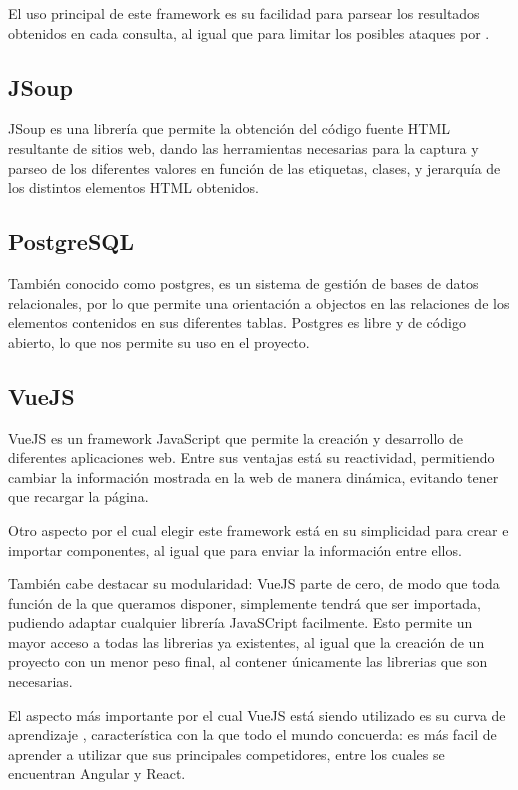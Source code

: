 El uso principal de este framework es su facilidad para parsear los resultados obtenidos en cada consulta, al igual que para limitar los posibles ataques por .

    \subsection{JSoup}

JSoup es una librería que permite la obtención del código fuente HTML resultante de sitios web, dando las herramientas necesarias para la captura y parseo de los diferentes valores en función de las etiquetas, clases, y jerarquía de los distintos elementos HTML obtenidos.
    
    \subsection{PostgreSQL}
También conocido como postgres, es un sistema de gestión de bases de datos relacionales, por lo que permite una orientación a objectos en las relaciones de los elementos contenidos en sus diferentes tablas.
Postgres es libre y de código abierto, lo que nos permite su uso en el proyecto.

    \subsection{VueJS}

VueJS es un framework JavaScript que permite la creación y desarrollo de diferentes aplicaciones web.
Entre sus ventajas está su reactividad, permitiendo cambiar la información mostrada en la web de manera dinámica, evitando tener que recargar la página. 

Otro aspecto por el cual elegir este framework está en su simplicidad para crear e importar componentes, al igual que para enviar la información entre ellos.

También cabe destacar su modularidad: VueJS parte de cero, de modo que toda función de la que queramos disponer, simplemente tendrá que ser importada, pudiendo adaptar cualquier librería JavaSCript facilmente. Esto permite un mayor acceso a todas las librerias ya existentes, al igual que la creación de un proyecto con un menor peso final, al contener únicamente las librerias que son necesarias.

El aspecto más importante por el cual VueJS está siendo utilizado es su curva de aprendizaje , característica con la que todo el mundo concuerda: es más facil de aprender a utilizar que sus principales competidores, entre los cuales se encuentran Angular y React.

